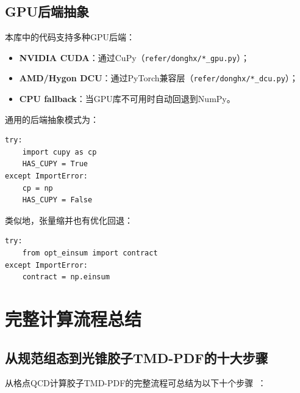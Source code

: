 \documentclass[12pt,a4paper]{ctexart}
\theoremstyle{definition}
\begin{document}
\subsection{GPU后端抽象}

本库中的代码支持多种GPU后端：
\begin{itemize}
    \item \textbf{NVIDIA CUDA}：通过CuPy（\texttt{refer/donghx/*\_gpu.py}）；
    \item \textbf{AMD/Hygon DCU}：通过PyTorch兼容层（\texttt{refer/donghx/*\_dcu.py}）；
    \item \textbf{CPU fallback}：当GPU库不可用时自动回退到NumPy。
\end{itemize}

通用的后端抽象模式为：
\begin{verbatim}
try:
    import cupy as cp
    HAS_CUPY = True
except ImportError:
    cp = np
    HAS_CUPY = False
\end{verbatim}

类似地，张量缩并也有优化回退：
\begin{verbatim}
try:
    from opt_einsum import contract
except ImportError:
    contract = np.einsum
\end{verbatim}


\section{完整计算流程总结}

\subsection{从规范组态到光锥胶子TMD-PDF的十大步骤}

从格点QCD计算胶子TMD-PDF的完整流程可总结为以下十个步骤~\cite{Chen2025gluon,NoteGluonPDFs}：
\end{document}

